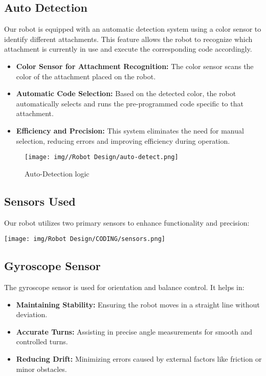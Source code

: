 \subsection{Auto Detection}
Our robot is equipped with an automatic detection system using a color sensor to identify different attachments. This feature allows the robot to recognize which attachment is currently in use and execute the corresponding code accordingly.

\begin{itemize}
    \item 	\textbf{Color Sensor for Attachment Recognition:} The color sensor scans the color of the attachment placed on the robot.
    \item 	\textbf{Automatic Code Selection:} Based on the detected color, the robot automatically selects and runs the pre-programmed code specific to that attachment.
    \item 	\textbf{Efficiency and Precision:} This system eliminates the need for manual selection, reducing errors and improving efficiency during operation.
\end{itemize}

\vspace{0.5cm}
\begin{figure}[h!]
    \centering
    \texttt{[image: img//Robot Design/auto-detect.png]}
    \caption{Auto-Detection logic}
    \label{fig:auto-detect}
\end{figure}
\newpage
\subsection{Sensors Used}

Our robot utilizes two primary sensors to enhance functionality and precision:
\vspace{1cm}
\begin{center}
  \texttt{[image: img/Robot Design/CODING/sensors.png]}
\end{center}

\subsection{Gyroscope Sensor}
The gyroscope sensor is used for orientation and balance control. It helps in:

\begin{itemize}
    \item 	\textbf{Maintaining Stability:} Ensuring the robot moves in a straight line without deviation.
    \item 	\textbf{Accurate Turns:} Assisting in precise angle measurements for smooth and controlled turns.
    \item 	\textbf{Reducing Drift:} Minimizing errors caused by external factors like friction or minor obstacles.
\end{itemize}

